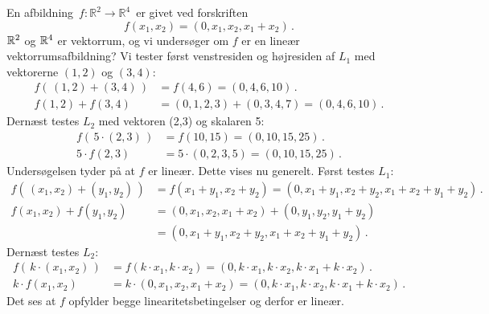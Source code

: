 \begin{example} \label{tn8.exL1L2_1}
En afbildning $\,f:\mathbb R^2\rightarrow \mathbb R^4\,$ er givet ved forskriften
\begin{equation}
f(x_1,x_2)=(0,x_1,x_2,x_1+x_2)\,.
\end{equation}
$\mathbb{R}^2$ og $\mathbb{R}^4$ er vektorrum, og vi undersøger om $f$ er en lineær vektorrumsafbildning? Vi tester først venstresiden og højresiden af $L_1$ med vektorerne $(1,2)$ og $(3,4)$:
\begin{align*}
f(\,(1,2)+(3,4)\,)&=f(4,6)=(0,4,6,10)\,.\\
f(1,2)+f(3,4)&=(0,1,2,3)+(0,3,4,7)=(0,4,6,10)\,.
\end{align*}
Dernæst testes $L_2$ med vektoren (2,3) og skalaren 5:
\begin{align*}
f(\,5\cdot(2,3)\,)&=f(10,15)=(0,10,15,25)\,.\\
5\cdot f(2,3)&=5\cdot(0,2,3,5)=(0,10,15,25)\,.
\end{align*}
Undersøgelsen tyder på at $f$ er lineær. Dette vises nu generelt. Først testes $L_1$:
\begin{align*}
f(\,(x_1,x_2)+(y_1,y_2)\,)&=f(x_1+y_1,x_2+y_2)=(0,x_1+y_1,x_2+y_2,x_1+x_2+y_1+y_2)\,.\\
f(x_1,x_2)+f(y_1,y_2)&=(0,x_1,x_2,x_1+x_2)+(0,y_1,y_2,y_1+y_2)\\&=(0,x_1+y_1,x_2+y_2,x_1+x_2+y_1+y_2)\,.
\end{align*}
Dernæst testes $L_2$:
\begin{align*}
f(\,k\cdot(x_1,x_2)\,)&=f(k\cdot x_1,k\cdot x_2)=(0,k\cdot x_1,k\cdot x_2,k\cdot x_1+k\cdot x_2)\,.\\
k\cdot f(x_1,x_2)&=k\cdot(0,x_1,x_2,x_1+x_2)=(0,k\cdot x_1,k\cdot x_2,k\cdot x_1+k\cdot x_2)\,.
\end{align*}
Det ses at $f$ opfylder begge linearitetsbetingelser og derfor er lineær.
\end{example}

